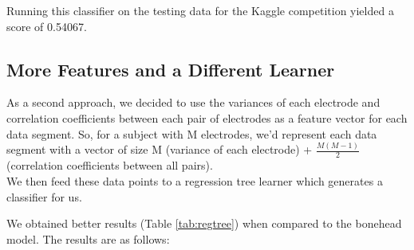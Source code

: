 \documentclass[a4paper]{article}
\begin{document}
Running this classifier on the testing data for the Kaggle competition yielded a score of 0.54067.

\subsection{More Features and a Different Learner}
As a second approach, we decided to use the variances of each electrode and correlation coefficients between each pair of electrodes as a feature vector for each data segment. So, for a subject with M electrodes, we'd represent each data segment with a vector of size M (variance of each electrode) + $\frac{M(M-1)}{2}$ (correlation coefficients between all pairs). \\
We then feed these data points to a regression tree learner which generates a classifier for us.

We obtained better results (Table \ref{tab:regtree}) when compared to the bonehead model. The results are as follows:

\begin{table}[!htbp]
\centering
{}
\caption{Performance of the regression tree model.}
\label{tab:regtree}
\end{table}
\end{document}
